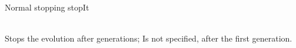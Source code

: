 

\begin{moduledoc}{Normal stopping }{stopIt}

\item[\KeyWord{maxGenerations} \optParam{cnt}]~\\
  Stops the evolution after  generations;
  Is  not specified, after the first generation.

\end{moduledoc}

